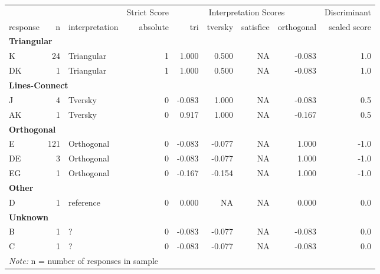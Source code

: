 \documentclass[
  letterpaper,
  DIV=11,
  numbers=noendperiod]{scrreprt}
\begin{document}
\begin{tabular}[t]{l|r|l|r|r|r|r|r|r}
\hline
\multicolumn{3}{c|}{ } & \multicolumn{1}{c|}{Strict Score} & \multicolumn{4}{c|}{Interpretation Scores} & \multicolumn{1}{c}{Discriminant} \\
\cline{4-4} \cline{5-8} \cline{9-9}
response & n & interpretation & absolute & tri & tversky & satisfice & orthogonal & scaled score\\
\hline
\multicolumn{9}{l}{\textbf{Triangular}}\\
\hline
\hspace{1em}K & 24 & Triangular & 1 & 1.000 & 0.500 & NA & -0.083 & 1.0\\
\hline
\hspace{1em}DK & 1 & Triangular & 1 & 1.000 & 0.500 & NA & -0.083 & 1.0\\
\hline
\multicolumn{9}{l}{\textbf{Lines-Connect}}\\
\hline
\hspace{1em}J & 4 & Tversky & 0 & -0.083 & 1.000 & NA & -0.083 & 0.5\\
\hline
\hspace{1em}AK & 1 & Tversky & 0 & 0.917 & 1.000 & NA & -0.167 & 0.5\\
\hline
\multicolumn{9}{l}{\textbf{Orthogonal}}\\
\hline
\hspace{1em}E & 121 & Orthogonal & 0 & -0.083 & -0.077 & NA & 1.000 & -1.0\\
\hline
\hspace{1em}DE & 3 & Orthogonal & 0 & -0.083 & -0.077 & NA & 1.000 & -1.0\\
\hline
\hspace{1em}EG & 1 & Orthogonal & 0 & -0.167 & -0.154 & NA & 1.000 & -1.0\\
\hline
\multicolumn{9}{l}{\textbf{Other}}\\
\hline
\hspace{1em}D & 1 & reference & 0 & 0.000 & NA & NA & 0.000 & 0.0\\
\hline
\multicolumn{9}{l}{\textbf{Unknown}}\\
\hline
\hspace{1em}B & 1 & ? & 0 & -0.083 & -0.077 & NA & -0.083 & 0.0\\
\hline
\hspace{1em}C & 1 & ? & 0 & -0.083 & -0.077 & NA & -0.083 & 0.0\\
\hline
\multicolumn{9}{l}{\rule{0pt}{1em}\textit{Note: } n = number of responses in sample}\\
\end{tabular}
\end{document}
